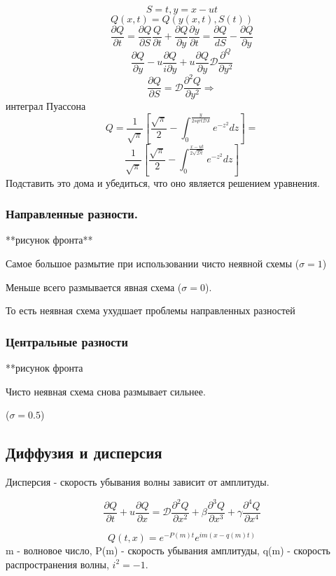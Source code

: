 \documentclass[12pt, a4paper]{article}
\begin{document}
\[ S = t, y = x - ut \]
\[ Q(x,t) = Q(y(x,t), S(t)) \]
\[ \frac{\partial Q }{\partial t } = \frac{\partial Q }{\partial S} \frac{ Q }{\partial t } + \frac{\partial Q }{\partial y}\frac{\partial y}{\partial t} = \frac{\partial Q }{d S}- \frac{\partial Q }{\partial y}\]
\[ \frac{\partial Q}{\partial y} - u \frac{\partial Q}{i\partial y}+ u \frac{\partial Q }{\partial y } \mathcal{D } \frac{\partial^Q }{\partial y^2} \]
\[ \frac{\partial Q }{\partial S } = \mathcal{D } \frac{\partial^2 Q}{\partial y^2} \Rightarrow\] интеграл Пуассона
\[ Q = \frac{1}{\sqrt{\pi}} [\frac{\sqrt{\pi}}{2} - \int_{0}^{\frac{y}{2 sqrt{\mathcal{D S}}}} e^{-z^2} dz] =  \]
\[ \frac{1}{\sqrt{\pi}} [\frac{\sqrt{\pi}}{2} - \int_{0}^{\frac{x - ut }{2 \sqrt{\mathcal{D }t }}} e^{-z^2} dz] \]
Подставить это дома и убедиться, что оно является решением уравнения.

\subsubsection{Направленные разности.}

**рисунок фронта**

Самое большое размытие при использовании чисто неявной схемы ($ \sigma = 1 $)

Меньше всего размывается явная схема ($ \sigma = 0 $).

То есть неявная схема ухудшает проблемы направленных разностей

\subsubsection{Центральные разности}

**рисунок фронта

Чисто неявная схема снова размывает сильнее.

($ \sigma = 0.5 $)

\subsection{Диффузия и дисперсия}

Дисперсия - скорость убывания волны зависит от амплитуды.

\[ \frac{\partial Q }{\partial t} + u \frac{\partial Q }{\partial x } = \mathcal{D } \frac{\partial^2 Q }{\partial x^2 } + \beta \frac{\partial^3 Q }{\partial x^3 } + \gamma \frac{\partial^4 Q }{\partial x^4} \]

\[Q(t, x) = e^{-P(m)t} e^{i m (x - q(m) t)} \]
m - волновое число,
P(m) - скорость убывания амплитуды,
q(m) - скорость распространения волны,
$ i^2 = -1 $.
\end{document}
